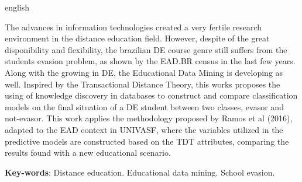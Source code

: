 \begin{resumo}[Abstract]
\begin{otherlanguage*}{english}

  The advances in information technologies created a very fertile research
  environment in the distance education field. However, despite of the great
  disponibility and flexibility, the   brazilian DE course genre still suffers
  from the students evasion problem, as shown by the EAD.BR census in the last
  few years. Along with the growing in DE, the Educational Data Mining is
  developing as well. Inspired by the Transactional Distance Theory, this works
  proposes the using of knowledge discovery in databases to construct and
  compare classification models on the final situation of a DE student between
  two classes, evasor and not-evasor. This work applies the methodology proposed
  by Ramos et al (2016), adapted to the EAD context in UNIVASF, where the variables utilized in the predictive models
  are constructed based on the TDT attributes, comparing the results found with
  a new educational scenario.

  \textbf{Key-words}: Distance education. Educational data mining. School
  evasion.

\end{otherlanguage*}
\end{resumo}


\begin{KeepFromToc} %
\listoffigures
\cleardoublepage


\listoftables
\cleardoublepage

\listofquadros*
\cleardoublepage



\end{KeepFromToc}

